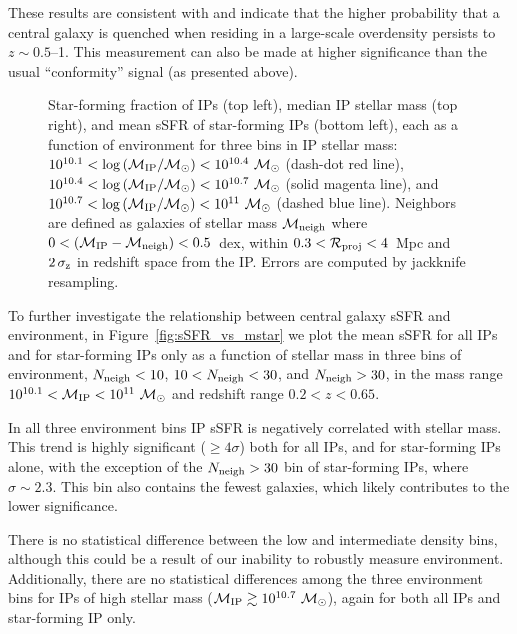 
These results are consistent with \citePB and indicate that the higher probability that a central galaxy is quenched when residing in a large-scale overdensity persists to $z\sim0.5$--1.  This measurement can also be made at higher significance than the usual ``conformity'' signal (as presented above). 

\begin{figure*}
  \epstrim{0.6in 0.3in 0.7in 0.8in}
  \caption{
Star-forming fraction of IPs (top left), median IP stellar mass (top right), and mean sSFR of star-forming IPs (bottom left),
each as a function of environment for three bins in IP stellar mass:~${10^{10.1}<\log\,(\mIP/\msun)<10^{10.4}~\msun}$ (dash-dot red line),
${10^{10.4}<\log\,(\mIP/\msun)<10^{10.7}~\msun}$ (solid magenta line), and
${10^{10.7}<\log\,(\mIP/\msun)<10^{11}~\msun}$ (dashed blue line).
Neighbors are defined as galaxies of stellar mass $\mneigh$ where ${0<(\mIP-\mneigh)<0.5}$~dex, within ${0.3<\mathcal{R}_{\text{proj}}<4}$~Mpc and $2\,\sigmaz$ in redshift space from the IP.
Errors are computed by jackknife resampling.
}
  \label{fig:environment}
\end{figure*}


To further investigate the relationship between central galaxy sSFR and environment, in Figure~\ref{fig:sSFR_vs_mstar} we plot the
mean sSFR for all IPs and for star-forming IPs only as a function of stellar mass in three bins of environment,
${\Nneigh<10}$, ${10<\Nneigh<30}$, and ${\Nneigh>30}$, in the mass range ${10^{10.1}<\mIP<10^{11}~\msun}$ and redshift range ${0.2<z<0.65}$.

In all three environment bins IP sSFR is negatively correlated with stellar mass.
This trend is highly significant (${\ge4\sigma}$) both for all IPs, and for star-forming IPs alone,
with the exception of the ${\Nneigh>30}$ bin of star-forming IPs, where ${\sigma\sim2.3}$.
This bin also contains the fewest galaxies, which likely contributes to the lower significance.

There is no statistical difference between the low and intermediate density bins, although this could be a result of our inability to robustly measure environment.
Additionally, there are no statistical differences among the three environment bins for IPs of high stellar mass ($\mIP\gtrsim10^{10.7}~\msun$),
again for both all IPs and star-forming IP only.

